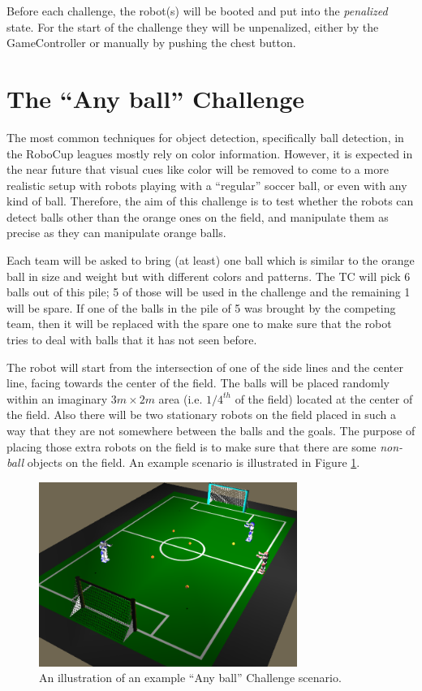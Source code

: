 \documentclass{article}
\begin{document}
Before each challenge, the robot(s) will be booted and put into the \emph{penalized} state. For the start of the challenge they will be unpenalized, either by the GameController or manually by pushing the chest button.

\section{The ``Any ball'' Challenge}
\label{sec:anyball}

The most common techniques for object detection, specifically ball detection, in the RoboCup leagues mostly rely on color information. However, it is expected in the near future that visual cues like color will be removed to come to a more realistic setup with robots playing with a ``regular'' soccer ball, or even with any kind of ball. Therefore, the aim of this challenge is to test whether the robots can detect balls other than the orange ones on the field, and manipulate them as precise as they can manipulate orange balls.

Each team will be asked to bring (at least) one ball which is similar to the orange ball in size and weight but with different colors and patterns. The TC will pick 6 balls out of this pile; 5 of those will be used in the challenge and the remaining 1 will be spare. If one of the balls in the pile of 5 was brought by the competing team, then it will be replaced with the spare one to make sure that the robot tries to deal with balls that it has not seen before.

The robot will start from the intersection of one of the side lines and the center line, facing towards the center of the field. The balls will be placed randomly within an imaginary $3m \times 2m$ area (i.e. $1/4^{th}$ of the field) located at the center of the field. Also there will be two stationary robots on the field placed in such a way that they are not somewhere between the balls and the goals. The purpose of placing those extra robots on the field is to make sure that there are some \emph{non-ball} objects on the field. An example scenario is illustrated in Figure \ref{fig:anyballchallenge}.

\begin{figure}[htbp]
 \centering
 \includegraphics[width=0.75\textwidth]{figures/nao_anyballchallenge.png}
 \caption{An illustration of an example ``Any ball'' Challenge scenario.}
 \label{fig:anyballchallenge}
\end{figure}
\end{document}
